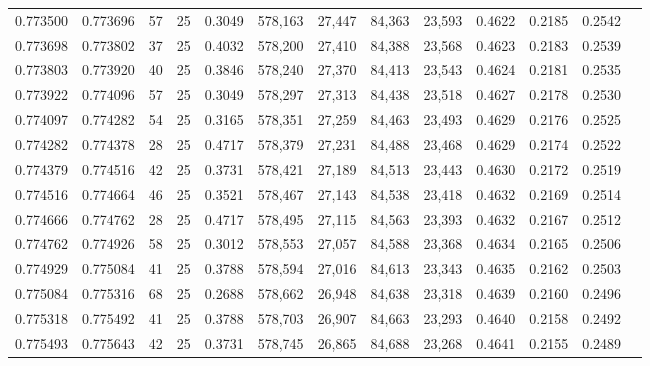 \begin{tabular}{rrrrrrrrrrrrr}
0.773500 & 0.773696 &    57 &  25 &                                     0.3049 & 578,163 &  27,447 &  84,363 &  23,593 & 0.4622 & 0.2185 & 0.2542 \\
0.773698 & 0.773802 &    37 &  25 &                                     0.4032 & 578,200 &  27,410 &  84,388 &  23,568 & 0.4623 & 0.2183 & 0.2539 \\
0.773803 & 0.773920 &    40 &  25 &                                     0.3846 & 578,240 &  27,370 &  84,413 &  23,543 & 0.4624 & 0.2181 & 0.2535 \\
0.773922 & 0.774096 &    57 &  25 &                                     0.3049 & 578,297 &  27,313 &  84,438 &  23,518 & 0.4627 & 0.2178 & 0.2530 \\
0.774097 & 0.774282 &    54 &  25 &                                     0.3165 & 578,351 &  27,259 &  84,463 &  23,493 & 0.4629 & 0.2176 & 0.2525 \\
0.774282 & 0.774378 &    28 &  25 &                                     0.4717 & 578,379 &  27,231 &  84,488 &  23,468 & 0.4629 & 0.2174 & 0.2522 \\
0.774379 & 0.774516 &    42 &  25 &                                     0.3731 & 578,421 &  27,189 &  84,513 &  23,443 & 0.4630 & 0.2172 & 0.2519 \\
0.774516 & 0.774664 &    46 &  25 &                                     0.3521 & 578,467 &  27,143 &  84,538 &  23,418 & 0.4632 & 0.2169 & 0.2514 \\
0.774666 & 0.774762 &    28 &  25 &                                     0.4717 & 578,495 &  27,115 &  84,563 &  23,393 & 0.4632 & 0.2167 & 0.2512 \\
0.774762 & 0.774926 &    58 &  25 &                                     0.3012 & 578,553 &  27,057 &  84,588 &  23,368 & 0.4634 & 0.2165 & 0.2506 \\
0.774929 & 0.775084 &    41 &  25 &                                     0.3788 & 578,594 &  27,016 &  84,613 &  23,343 & 0.4635 & 0.2162 & 0.2503 \\
0.775084 & 0.775316 &    68 &  25 &                                     0.2688 & 578,662 &  26,948 &  84,638 &  23,318 & 0.4639 & 0.2160 & 0.2496 \\
0.775318 & 0.775492 &    41 &  25 &                                     0.3788 & 578,703 &  26,907 &  84,663 &  23,293 & 0.4640 & 0.2158 & 0.2492 \\
0.775493 & 0.775643 &    42 &  25 &                                     0.3731 & 578,745 &  26,865 &  84,688 &  23,268 & 0.4641 & 0.2155 & 0.2489 \\

\end{tabular}
